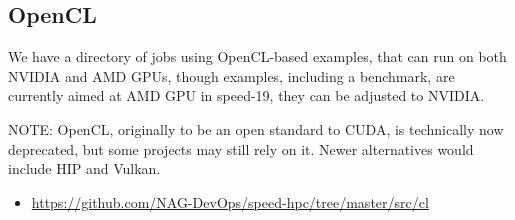\subsection{OpenCL}
\label{sect:cl}

We have a directory of jobs using OpenCL-based examples, that can
run on both NVIDIA and AMD GPUs, though examples, including a
benchmark, are currently aimed at AMD GPU in speed-19, they can
be adjusted to NVIDIA.

NOTE: OpenCL, originally to be an open standard to CUDA,
is technically now deprecated, but some projects may still
rely on it. Newer alternatives would include HIP and Vulkan.

\begin{itemize}
  \item \url{https://github.com/NAG-DevOps/speed-hpc/tree/master/src/cl}
\end{itemize}

